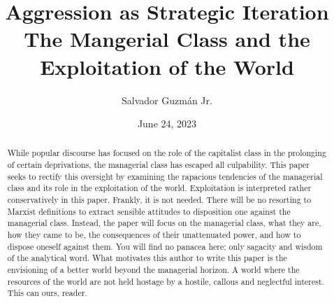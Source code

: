 \documentclass[12pt]{article}
\title{
 Aggression as Strategic Iteration \\
 \large The Mangerial Class and the Exploitation of the World}
\author{Salvador Guzm\'an Jr.}
\date{June 24, 2023}
\begin{document}
\maketitle
\pagebreak

\begin{abstract}
    While popular discourse has focused on the role of the capitalist class in the prolonging of certain deprivations, the managerial class has escaped all culpability.
    This paper seeks to rectify this oversight by examining the rapacious tendencies of the managerial class and its role in the exploitation of the world.
    Exploitation is interpreted rather conservatively in this paper.
    Frankly, it is not needed.
    There will be no resorting to Marxist definitions to extract sensible attitudes to disposition one against the managerial class. Instead, the paper will focus on the managerial class, what they are, how they came to be, the consequences of their unattenuated power, and how to dispose oneself against them.
    You will find no panacea here; only sagacity and wisdom of the analytical word. What motivates this author to write this paper is the envisioning of a better world beyond the managerial horizon.
    A world where the resources of the world are not held hostage by a hostile, callous and neglectful interest.
    This can ours, reader.
\end{abstract}
\pagebreak
\tableofcontents
\pagebreak
\end{document}
